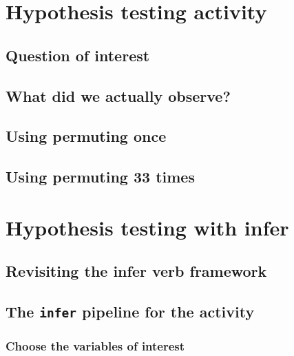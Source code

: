 \documentclass[
  12pt, krantz2,
]{krantz}
\begin{document}
\hypertarget{ht-activity}{%
\section{Hypothesis testing activity}\label{ht-activity}}

\hypertarget{question-of-interest}{%
\subsection{Question of interest}\label{question-of-interest}}

\hypertarget{what-did-we-actually-observe}{%
\subsection{What did we actually observe?}\label{what-did-we-actually-observe}}

\hypertarget{using-permuting-once}{%
\subsection{Using permuting once}\label{using-permuting-once}}

\hypertarget{using-permuting-33-times}{%
\subsection{Using permuting 33 times}\label{using-permuting-33-times}}

\hypertarget{ht-infer}{%
\section{Hypothesis testing with infer}\label{ht-infer}}

\hypertarget{revisiting-the-infer-verb-framework}{%
\subsection{Revisiting the infer verb framework}\label{revisiting-the-infer-verb-framework}}

\hypertarget{the-infer-pipeline-for-the-activity}{%
\subsection{\texorpdfstring{The \texttt{infer} pipeline for the activity}{The infer pipeline for the activity}}\label{the-infer-pipeline-for-the-activity}}

\hypertarget{choose-the-variables-of-interest}{%
\subsubsection*{Choose the variables of interest}\label{choose-the-variables-of-interest}}
\end{document}
